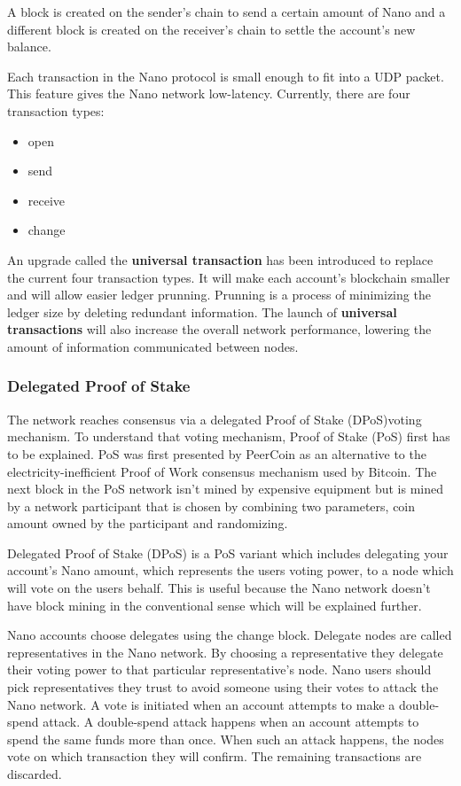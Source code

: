 \documentclass{ferseminar}
\begin{document}
A block is created on the sender's chain to send a certain amount of Nano and a different block is created on the receiver's chain to settle the account's new balance.

Each transaction in the Nano protocol is small enough to fit into a UDP packet. This feature gives the Nano network low-latency. Currently, there are four transaction types: 
\begin{itemize}
	\item open
	\item send
	\item receive
	\item change
\end{itemize}

An upgrade called the \textbf{universal transaction} has been introduced to replace the current four transaction types. It will make each account's blockchain smaller and will allow easier ledger prunning. Prunning is a process of minimizing the ledger size by deleting redundant information. The launch of \textbf{universal transactions} will also increase the overall network performance, lowering the amount of information communicated between nodes.


\subsubsection{Delegated Proof of Stake}

The network reaches consensus via a delegated Proof of Stake (DPoS)voting mechanism. To understand that voting mechanism, Proof of Stake (PoS) first has to be explained. PoS was first presented by PeerCoin \cite{Peercoin} as an alternative to the electricity-inefficient Proof of Work consensus mechanism used by Bitcoin. The next block in the PoS network isn't mined by expensive equipment but is mined by a network participant that is chosen by combining two parameters, coin amount owned by the participant and randomizing.

Delegated Proof of Stake (DPoS) is a PoS variant which includes delegating your account's Nano amount, which represents the users voting power, to a node which will vote on the users behalf. This is useful because the Nano network doesn't have block mining in the conventional sense which will be explained further. 

Nano accounts choose delegates using the change block. Delegate nodes are called representatives in the Nano network. By choosing a representative they delegate their voting power to that particular representative's node. Nano users should pick representatives they trust to avoid someone using their votes to attack the Nano network. A vote is initiated when an account attempts to make a double-spend attack. A double-spend attack happens when an account attempts to spend the same funds more than once. When such an attack happens, the nodes vote on which transaction they will confirm. The remaining transactions are discarded.
\end{document}
